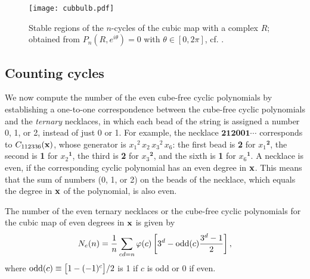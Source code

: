 \documentclass[twocolumn]{revtex4-1}
\begin{document}
\begin{figure}[h]
  \begin{minipage}{\linewidth}
    \begin{center}
        \texttt{[image: cubbulb.pdf]}
    \end{center}
  \end{minipage}%
  \caption{
  \label{fig:cubbulb}
  Stable regions of the $n$-cycles of the cubic map 
  with a complex $R$;
  obtained from $P_n(R, e^{i\theta}) = 0$ with $\theta \in [0, 2\pi]$,
  cf. .
}
\end{figure}


\subsection{Counting cycles}

We now compute the number of the even cube-free cyclic polynomials
by establishing a one-to-one correspondence between
the cube-free cyclic polynomials and the \emph{ternary} necklaces,
in which each bead of the string is assigned a number
0, 1, or 2, instead of just 0 or 1.
%
For example, the necklace $\mathbf{212001\cdots}$
corresponds to $C_{112336}(\mathbf{x})$,
whose generator is
${x_1}^2 \, {x_2} \, {x_3}^2 \, x_6$:
the first bead is \textbf{2} for ${x_1}^\mathbf{2}$,
 the second is \textbf{1} for ${x_2}^\mathbf{1}$,
 the third is \textbf{2} for ${x_3}^\mathbf{2}$,
 and the sixth is \textbf{1} for ${x_6}^\mathbf{1}$.
%
A necklace is even,
if the corresponding cyclic polynomial has an even degree in $\mathbf{x}$.
%
This means that the sum of numbers (0, 1, or 2)
  on the beads of the necklace,
  which equals the degree in $\mathbf{x}$ of the polynomial, is also even.

%


\begin{theorem}
The number of the even ternary necklaces
or the cube-free cyclic polynomials for the cubic map of even degrees in $\mathbf{x}$
is given by
\begin{equation}
  N_e(n) = \frac{1}{n} \sum_{c d = n} \varphi(c)
    \left[
      3^d - \mathrm{odd}(c) \frac{3^d-1}{2}
    \right],
\label{eq:cubnecklace}
\end{equation}
where
$\mathrm{odd}(c) \equiv \big[1 - (-1)^c\big]/2$ is 1 if $c$ is odd or 0 if even.
\label{thm:cubnecklace}
\end{theorem}
\end{document}
